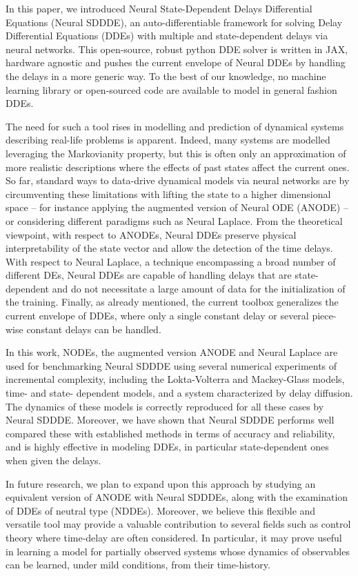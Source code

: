 In this paper, we introduced Neural State-Dependent Delays Differential Equations (Neural SDDDE), an auto-differentiable framework for solving Delay Differential Equations (DDEs) with multiple and state-dependent delays via neural networks. This open-source, robust python DDE solver is written in JAX, hardware agnostic and pushes the current envelope of Neural DDEs by handling the delays in a more generic way. To the best of our knowledge, no machine learning library or open-sourced code are available to model in general fashion DDEs. 

The need for such a tool rises in modelling and prediction of dynamical systems describing real-life problems is apparent. Indeed, many systems are modelled leveraging the Markovianity property, but this is often only an approximation of more realistic descriptions where the effects of past states affect the current ones. So far, standard ways to data-drive dynamical models via neural networks are by circumventing these limitations with lifting the state to a higher dimensional space – for instance applying the augmented version of Neural ODE (ANODE) – or considering different paradigms such as Neural Laplace. From the theoretical viewpoint, with respect to ANODEs, Neural DDEs preserve physical interpretability of the state vector and allow the detection of the time delays. With respect to Neural Laplace, a technique encompassing a broad number of different DEs, Neural DDEs are capable of handling delays that are state-dependent and do not necessitate a large amount of data for the initialization of the training. Finally, as already mentioned, the current toolbox generalizes the current envelope of DDEs, where only a single constant delay or several piece-wise constant delays can be handled. 

In this work, NODEs, the augmented version ANODE and Neural Laplace are used for benchmarking Neural SDDDE using several numerical experiments of incremental complexity, including the Lokta-Volterra and Mackey-Glass models, time- and state- dependent models, and a system characterized by delay diffusion. The dynamics of these models is correctly reproduced for all these cases by Neural SDDDE. Moreover, we have shown that Neural SDDDE performs well compared these with established methods in terms of accuracy and reliability, and is highly effective in modeling DDEs, in particular state-dependent ones when given the delays.

In future research, we plan to expand upon this approach by studying an equivalent version of ANODE with Neural SDDDEs, along with the examination of DDEs of neutral type (NDDEs). Moreover, we believe this flexible and versatile tool may provide a valuable contribution to several fields such as control theory where time-delay are often considered. In particular, it may prove useful in learning a model for partially observed systems whose dynamics of observables can be learned, under mild conditions, from their time-history. 


